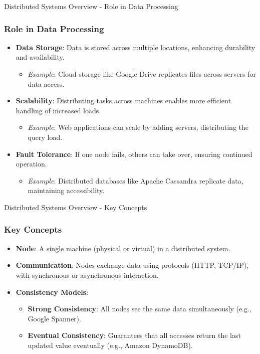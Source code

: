 \documentclass[aspectratio=169]{beamer}
\begin{document}
\begin{frame}[fragile]{Distributed Systems Overview - Role in Data Processing}
    \frametitle{Role in Data Processing}
    \begin{itemize}
        \item \textbf{Data Storage}: Data is stored across multiple locations, enhancing durability and availability.
        \begin{itemize}
            \item \textit{Example}: Cloud storage like Google Drive replicates files across servers for data access.
        \end{itemize}
        
        \item \textbf{Scalability}: Distributing tasks across machines enables more efficient handling of increased loads.
        \begin{itemize}
            \item \textit{Example}: Web applications can scale by adding servers, distributing the query load.
        \end{itemize}
        
        \item \textbf{Fault Tolerance}: If one node fails, others can take over, ensuring continued operation.
        \begin{itemize}
            \item \textit{Example}: Distributed databases like Apache Cassandra replicate data, maintaining accessibility.
        \end{itemize}
    \end{itemize}
\end{frame}

\begin{frame}[fragile]{Distributed Systems Overview - Key Concepts}
    \frametitle{Key Concepts}
    \begin{itemize}
        \item \textbf{Node}: A single machine (physical or virtual) in a distributed system.
        \item \textbf{Communication}: Nodes exchange data using protocols (HTTP, TCP/IP), with synchronous or asynchronous interaction.
        \item \textbf{Consistency Models}:
        \begin{itemize}
            \item \textbf{Strong Consistency}: All nodes see the same data simultaneously (e.g., Google Spanner).
            \item \textbf{Eventual Consistency}: Guarantees that all accesses return the last updated value eventually (e.g., Amazon DynamoDB).
        \end{itemize}
    \end{itemize}
\end{frame}
\end{document}
